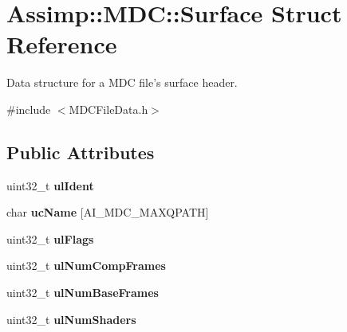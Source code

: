 \hypertarget{struct_assimp_1_1_m_d_c_1_1_surface}{\section{Assimp\+:\+:M\+D\+C\+:\+:Surface Struct Reference}
\label{struct_assimp_1_1_m_d_c_1_1_surface}
}


Data structure for a M\+D\+C file's surface header.  




{\ttfamily \#include $<$M\+D\+C\+File\+Data.\+h$>$}

\subsection*{Public Attributes}
\begin{DoxyCompactItemize}
\item 
\hypertarget{struct_assimp_1_1_m_d_c_1_1_surface_a8d06c84be2f524b8163942ad2f6f38c4}{uint32\+\_\+t {\bfseries ul\+Ident}}\label{struct_assimp_1_1_m_d_c_1_1_surface_a8d06c84be2f524b8163942ad2f6f38c4}

\item 
\hypertarget{struct_assimp_1_1_m_d_c_1_1_surface_a2120e4c2a1ded116fcf7081f2c5e0f21}{char {\bfseries uc\+Name} \mbox{[}A\+I\+\_\+\+M\+D\+C\+\_\+\+M\+A\+X\+Q\+P\+A\+T\+H\mbox{]}}\label{struct_assimp_1_1_m_d_c_1_1_surface_a2120e4c2a1ded116fcf7081f2c5e0f21}

\item 
\hypertarget{struct_assimp_1_1_m_d_c_1_1_surface_a194a6daa7c36cbdeec844c24d9895d9f}{uint32\+\_\+t {\bfseries ul\+Flags}}\label{struct_assimp_1_1_m_d_c_1_1_surface_a194a6daa7c36cbdeec844c24d9895d9f}

\item 
\hypertarget{struct_assimp_1_1_m_d_c_1_1_surface_a1687679fb1852981a8de5f84eaa503cd}{uint32\+\_\+t {\bfseries ul\+Num\+Comp\+Frames}}\label{struct_assimp_1_1_m_d_c_1_1_surface_a1687679fb1852981a8de5f84eaa503cd}

\item 
\hypertarget{struct_assimp_1_1_m_d_c_1_1_surface_aa39c0c74e4c7449f717a6d0716bcf60a}{uint32\+\_\+t {\bfseries ul\+Num\+Base\+Frames}}\label{struct_assimp_1_1_m_d_c_1_1_surface_aa39c0c74e4c7449f717a6d0716bcf60a}

\item 
\hypertarget{struct_assimp_1_1_m_d_c_1_1_surface_a533ded7ae3ea5526e050355eb5882a9f}{uint32\+\_\+t {\bfseries ul\+Num\+Shaders}}\label{struct_assimp_1_1_m_d_c_1_1_surface_a533ded7ae3ea5526e050355eb5882a9f}


\end{DoxyCompactItemize}
